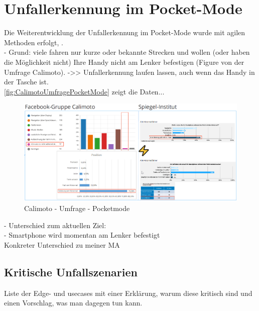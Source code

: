 \chapter{Unfallerkennung im Pocket-Mode}

Die Weiterentwicklung der Unfallerkennung im Pocket-Mode wurde mit agilen Methoden erfolgt, .\\



- Grund: viele fahren nur kurze oder bekannte Strecken und wollen (oder haben die Möglichkeit nicht) Ihre Handy nicht am Lenker befestigen (Figure von der Umfrage Calimoto). ->> Unfallerkennung laufen lassen, auch wenn das Handy in der Tasche ist.\\

\autoref{fig:CalimotoUmfragePocketMode} zeigt die Daten...

\begin{figure}[H]
	\centering
	\includegraphics[width=\linewidth]{Bilder/CalimotoUmfragePocketMode.png}
	\caption{Calimoto - Umfrage - Pocketmode}
	\label{fig:CalimotoUmfragePocketMode}
\end{figure}

- Unterschied zum aktuellen Ziel:\\
- Smartphone wird momentan am Lenker befestigt\\

Konkreter Unterschied zu meiner MA

\section{Kritische Unfallszenarien}

Liste der Edge- und usecases mit einer Erklärung, warum diese kritisch sind und einen Vorschlag, was man dagegen tun kann.


